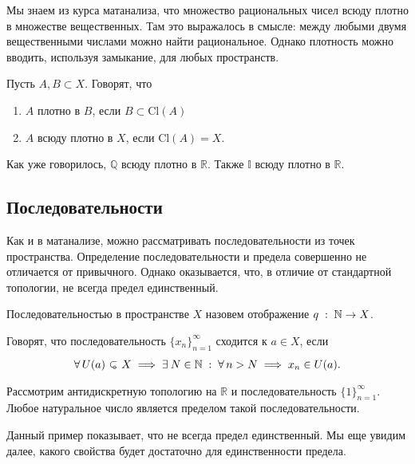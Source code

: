     Мы знаем из курса матанализа, что множество рациональных чисел всюду плотно в множестве вещественных. Там это выражалось в смысле: между любыми двумя вещественными числами можно найти рациональное. Однако плотность можно вводить, используя замыкание, для любых пространств.
    \begin{Def}
        Пусть $A, B \subset X$. Говорят, что
        \begin{enumerate}
            \item $A$ плотно в $B$, если $B \subset \mathrm{Cl}(A)$
            \item $A$ всюду плотно в $X$, если $\mathrm{Cl}(A) = X$.
        \end{enumerate}
    \end{Def}
    \begin{Ex}
        Как уже говорилось, $\mathbb{Q}$ всюду плотно в $\mathbb{R}$. Также $\mathbb{I}$ всюду плотно в $\mathbb{R}$. 
    \end{Ex}

    \subsection{Последовательности}
    Как и в матанализе, можно рассматривать последовательности из точек пространства. Определение последовательности и предела совершенно не отличается от привычного. Однако оказывается, что, в отличие от стандартной топологии, не всегда предел единственный.
    \begin{Def}
        [Последовательность]
        Последовательностью в пространстве $X$ назовем отображение $q\; : \; \mathbb{N} \to X$.
    \end{Def}
    \begin{Def}
        Говорят, что последовательность $\{x_n\}_{n=1}^\infty$ сходится к $a \in X$, если \[
            \forall U(a) \open X \implies \exists N \in \mathbb{N} \st \forall n > N \implies x_n \in U(a).
        \] 
    \end{Def}
    \begin{Ex}
        Рассмотрим антидискретную топологию на $\mathbb{R}$ и последовательность $\{1\}_{n=1}^\infty$. Любое натуральное число является пределом такой последовательности.
    \end{Ex}
    Данный пример показывает, что не всегда предел единственный. Мы еще увидим далее, какого свойства будет достаточно для единственности предела. 
